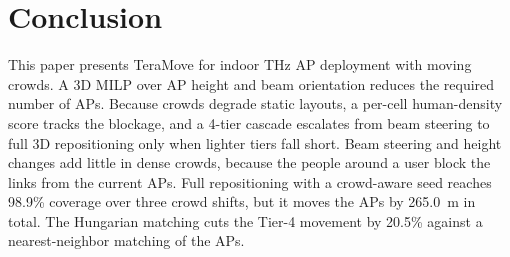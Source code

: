 \documentclass[conference]{IEEEtran}
\begin{document}
	\section{Conclusion}

	This paper presents TeraMove for indoor THz AP deployment with moving crowds. A 3D MILP over AP height and beam orientation reduces the required number of APs. Because crowds degrade static layouts, a per-cell human-density score tracks the blockage, and a 4-tier cascade escalates from beam steering to full 3D repositioning only when lighter tiers fall short. Beam steering and height changes add little in dense crowds, because the people around a user block the links from the current APs. Full repositioning with a crowd-aware seed reaches 98.9\% coverage over three crowd shifts, but it moves the APs by 265.0~m in total. The Hungarian matching cuts the Tier-4 movement by 20.5\% against a nearest-neighbor matching of the APs.
\end{document}
